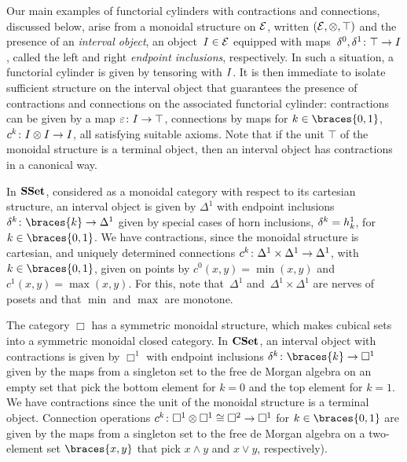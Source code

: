 \documentclass[reqno,10pt,a4paper,oneside,draft]{amsart}
\begin{document}
Our main examples of functorial cylinders with  contractions and connections, discussed below, arise from a monoidal
structure on $\mathcal{E}$, written $(\mathcal{E}, \otimes, \top)$ and the presence of an \emph{interval object}, \ie an object~$I \in \mathcal{E}$ 
equipped with maps~$\delta^0, \delta^1 \colon \top \to I$, called the left 
and right \emph{endpoint inclusions}, respectively. In such a situation, a functorial cylinder is given by tensoring with $I$. 
It is then immediate to isolate sufficient structure on the interval object that guarantees the presence of contractions and connections on the associated functorial cylinder: 
contractions can be given by a map $\varepsilon \colon I \to \top$, connections by maps for $k \in \braces{0, 1}$, $c^k \colon I \otimes I \to I$,
all satisfying suitable axioms. Note that if the unit $\top$ of the monoidal structure is a terminal object, then an interval object  has contractions in a canonical way.





\begin{example} \label{exa:cyl-in-sset}
In $\mathbf{SSet}$, considered as a monoidal category with respect to its cartesian structure, 
an interval object is given by $\Delta^1$ with endpoint inclusions~$\kcyl  \co \braces{k} \to \Delta^1$ given 
by special cases of horn inclusions, $\delta^k = h^1_k$, for $k \in \braces{ 0, 1}$. We have contractions, since the monoidal structure is cartesian,
and uniquely determined connections $c^k \colon \Delta^1 \times \Delta^1 \to \Delta^1$, with $k \in \braces{0, 1}$, given on points by 
$c^0(x, y) = \min(x, y)$ and $c^1(x, y) = \max(x, y)$.
For this, note that~$\Delta^1$ and~$\Delta^1 \times \Delta^1$ are nerves of posets and that $\min$ and $\max$ are monotone.
\end{example}

\begin{example} \label{exa:cyl-in-cuset}
The category $\Box$ has a symmetric monoidal structure, which makes cubical sets into a symmetric monoidal closed category.
In $\mathbf{CSet}$, an interval object with contractions is given by $\Box^1$ with endpoint inclusions $\kcyl \co \braces{k} \to \Box^1$  given by the maps from a singleton set to the free de Morgan algebra 
on an empty set that pick the bottom element for $k = 0$ and the top element for $k =1$.
We have contractions since the unit of the monoidal structure  is a terminal object. 
Connection operations $c^k \colon \Box^1 \otimes \Box^1 \cong \Box^2 \to \Box^1$ for $k \in \braces{0, 1}$ are 
 given by the maps from a singleton set to the free de Morgan algebra on a two-element set $\braces{x, y}$ that pick $x \wedge y$ and $x \vee y$, respectively).
\end{example}
\end{document}

